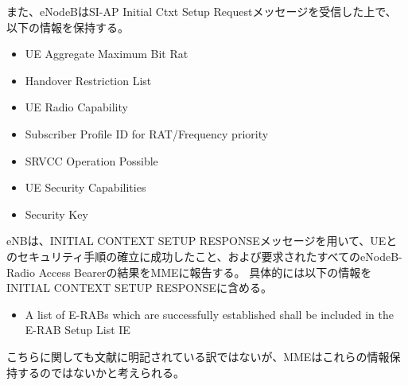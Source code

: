 \documentclass[a4j]{ujarticle}
\begin{document}
また、eNodeBはSI-AP Initial Ctxt Setup Requestメッセージを受信した上で、以下の情報を保持する。
\begin{itemize}
  \item UE Aggregate Maximum Bit Rat
  \item Handover Restriction List
  \item UE Radio Capability
  \item Subscriber Profile ID for RAT/Frequency priority
  \item SRVCC Operation Possible
  \item UE Security Capabilities
  \item Security Key
\end{itemize}

eNBは、INITIAL CONTEXT SETUP RESPONSEメッセージを用いて、UEとのセキュリティ手順の確立に成功したこと、および要求されたすべてのeNodeB-Radio Access Bearerの結果をMMEに報告する。 具体的には以下の情報をINITIAL CONTEXT SETUP RESPONSEに含める。
\begin{itemize}
  \item A list of E-RABs which are successfully established shall be included in the E-RAB Setup List IE
\end{itemize}
こちらに関しても文献に明記されている訳ではないが、MMEはこれらの情報保持するのではないかと考えられる。
\end{document}
